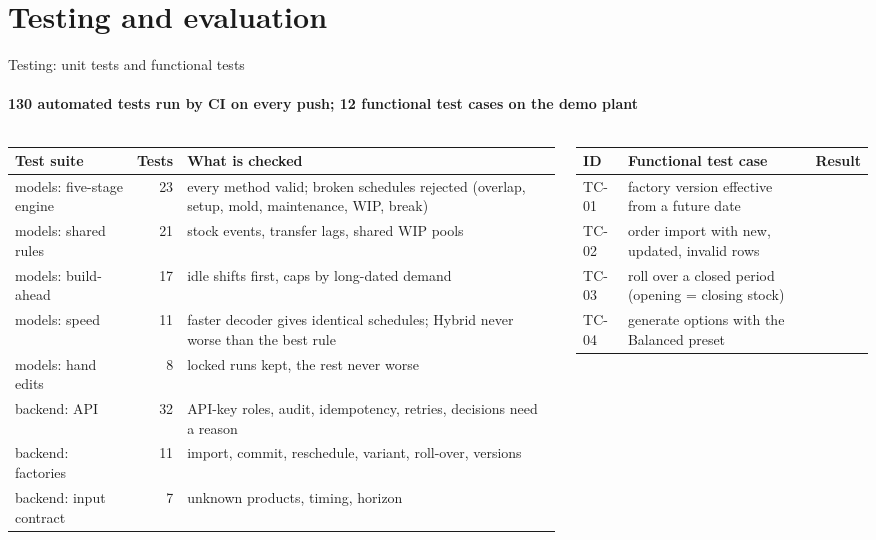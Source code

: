 \section{Testing and evaluation}

\begin{frame}{Testing: unit tests and functional tests}
\framesubtitle{130 automated tests run by CI on every push; 12 functional test cases on the demo plant}
\begin{columns}[T]
\begin{column}{0.53\textwidth}
\tiny
\setlength{\tabcolsep}{3pt}
\begin{tabular}{@{}L{2.65cm}rL{3.6cm}@{}}
\toprule
Test suite & Tests & What is checked\\
\midrule
models: five-stage engine & 23 & every method valid; broken schedules rejected (overlap, setup, mold, maintenance, WIP, break)\\
models: shared rules & 21 & stock events, transfer lags, shared WIP pools\\
models: build-ahead & 17 & idle shifts first, caps by long-dated demand\\
models: speed & 11 & faster decoder gives identical schedules; Hybrid never worse than the best rule\\
models: hand edits & 8 & locked runs kept, the rest never worse\\
backend: API & 32 & API-key roles, audit, idempotency, retries, decisions need a reason\\
backend: factories & 11 & import, commit, reschedule, variant, roll-over, versions\\
backend: input contract & 7 & unknown products, timing, horizon\\
\bottomrule
\end{tabular}
\end{column}
\begin{column}{0.44\textwidth}
\tiny
\setlength{\tabcolsep}{3pt}
\begin{tabular}{@{}lL{3.7cm}l@{}}
\toprule
ID & Functional test case & Result\\
\midrule
TC-01 & factory version effective from a future date & \\
TC-02 & order import with new, updated, invalid rows & \\
TC-03 & roll over a closed period (opening = closing stock) & \\
TC-04 & generate options with the Balanced preset & \\

\end{tabular}
\end{column}
\end{columns}
\end{frame}
